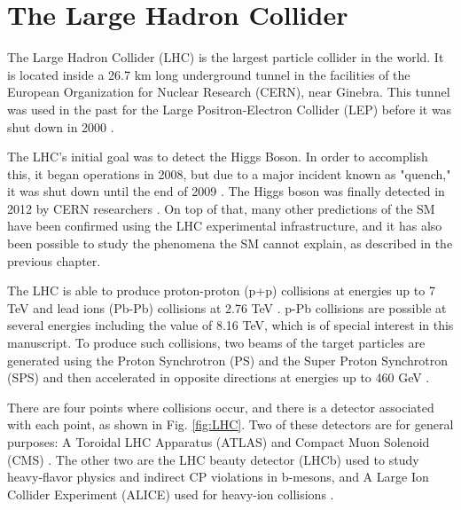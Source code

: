 \chapter{\leavevmode\newline The Large Hadron Collider}
\label{chap:chapter_2}

The Large Hadron Collider (LHC) is the largest particle collider in the world. It is located inside a 26.7 km long underground tunnel in the facilities of the European Organization for Nuclear Research (CERN), near Ginebra. This tunnel was used in the past for the Large Positron-Electron Collider (LEP) before it was shut down in 2000 \cite{stiller2016full, baron2018desarrollo}.

The LHC's initial goal was to detect the Higgs Boson. In order to accomplish this, it began operations in 2008, but due to a major incident known as "quench," it was shut down until the end of 2009 \cite{oneill_2015, di2020measurement}. The Higgs boson was finally detected in 2012 by CERN researchers \cite{cern_document_server_2012}. On top of that, many other predictions of the SM have been confirmed using the LHC experimental infrastructure, and it has also been possible to study the phenomena the SM cannot explain, as described in the previous chapter.

The LHC is able to produce proton-proton (p+p) collisions at energies up to 7 TeV and lead ions (Pb-Pb) collisions at 2.76 TeV \cite{stiller2016full}. p-Pb collisions are possible at several energies \cite{vovchenko2019canonical}  including the value of 8.16 TeV, which is of special interest in this manuscript. To produce such collisions, two beams of the target particles are generated using the Proton Synchrotron (PS) and the Super Proton Synchrotron (SPS) and then accelerated in opposite directions at energies up to 460 GeV \cite{grummer2021search, bragagnolo2021measurement, mejia2012medida}.

There are four points where collisions occur, and there is a detector associated with each point, as shown in Fig. \ref{fig:LHC}. Two of these detectors are for general purposes: A Toroidal LHC Apparatus (ATLAS) and Compact Muon Solenoid (CMS) \cite{bonanomi2021response, baron2018desarrollo}. The other two are the LHC beauty detector (LHCb) used to study heavy-flavor physics and indirect CP violations in b-mesons, and A Large Ion Collider Experiment (ALICE) used for heavy-ion collisions \cite{stiller2016full, bonanomi2021response}.

